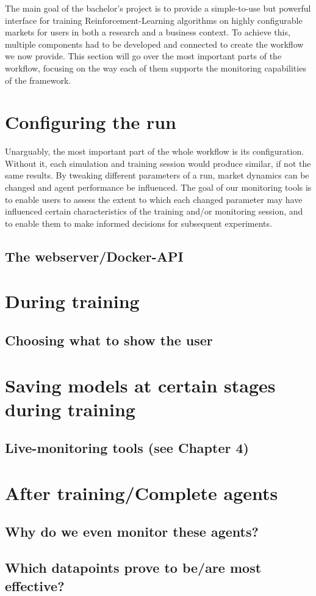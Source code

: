 \label{chapter:OurWorkflow}

\begin{jointwork}
	The main goal of the bachelor's project is to provide a simple-to-use but powerful interface for training Reinforcement-Learning algorithms on highly configurable markets for users in both a research and a business context. To achieve this, multiple components had to be developed and connected to create the workflow we now provide. This section will go over the most important parts of the workflow, focusing on the way each of them supports the monitoring capabilities of the framework.
\end{jointwork}

\section{Configuring the run}

Unarguably, the most important part of the whole workflow is its configuration. Without it, each simulation and training session would produce similar, if not the same results. By tweaking different parameters of a run, market dynamics can be changed and agent performance be influenced. The goal of our monitoring tools is to enable users to assess the extent to which each changed parameter may have influenced certain characteristics of the training and/or monitoring session, and to enable them to make informed decisions for subsequent experiments.

\subsection{The webserver/Docker-API}



\section{During training}
\subsection{Choosing what to show the user}
\section{Saving models at certain stages during training}
\subsection{Live-monitoring tools (see Chapter 4)}

\section{After training/Complete agents}
\subsection{Why do we even monitor these agents?}
\subsection{Which datapoints prove to be/are most effective?}